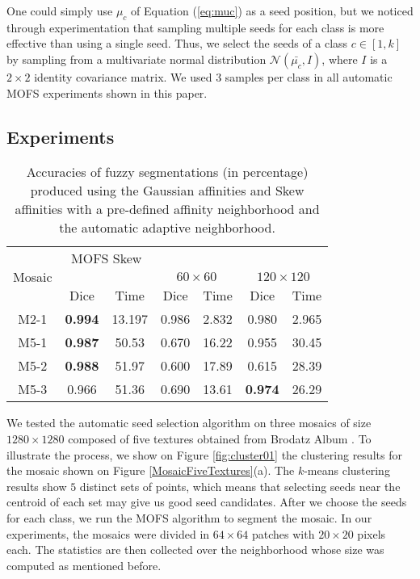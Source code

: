 \documentclass[10pt,twocolumn,letterpaper]{article}
\begin{document}
One could simply use $\mu_c$ of Equation (\ref{eq:muc}) as a seed position, but we noticed through experimentation that sampling multiple seeds for each class is more effective than using a single seed. Thus, we select the seeds of a class $c \in [1, k]$ by sampling from a multivariate normal distribution $\mathcal{N}(\bar{\mu_c}, I)$, where $I$ is a $2\times2$ identity covariance matrix. We used 3 samples per class in all automatic MOFS experiments shown in this paper. 

\subsection{Experiments}

\setlength{\tabcolsep}{6pt}
\begin{table*}
\begin{center}
\begin{tabular}{|c|c|c|c|c|c|c|}
\hline
\multirow{3}{*}{Mosaic}& \multicolumn{2}{|c|}{MOFS Skew}& \multicolumn{4}{|c|}{\cite{YUAN15a}}  \\
\cline{4-7}
  & \multicolumn{2}{|c|}{ } & \multicolumn{2}{|c|}{$60 \times 60$} & \multicolumn{2}{|c|}{$120 \times 120$}  \\
\cline{2-7}
  & Dice & Time & Dice & Time & Dice & Time  \\
\hline
M2-1 & \textbf{0.994} & 13.197 & 0.986 & 2.832 & 0.980 & 2.965 \\
\hline
M5-1 & \textbf{0.987} & 50.53 & 0.670 & 16.22 & 0.955 & 30.45   \\
\hline
M5-2 & \textbf{0.988} & 51.97 & 0.600 & 17.89 & 0.615 & 28.39   \\
\hline
M5-3 & 0.966 & 51.36 & 0.690 & 13.61 & \textbf{0.974} & 26.29   \\
\hline
\end{tabular}
\end{center}
\caption{Accuracies of fuzzy segmentations (in percentage) produced using the Gaussian affinities and Skew affinities with a pre-defined affinity neighborhood and the automatic adaptive neighborhood.}
\label{AccuracyTable}
\end{table*}


We tested the automatic seed selection algorithm on three mosaics of size $1280 \times 1280$ composed of five textures obtained from Brodatz Album \cite{BROD66a}. To illustrate the process, we show on Figure \ref{fig:cluster01} the clustering results for the mosaic shown on Figure \ref{MosaicFiveTextures}(a). The $k$-means clustering results show $5$ distinct sets of points, which means that selecting seeds near the centroid of each set may give us good seed candidates. After we choose the seeds for each class, we run the MOFS algorithm to segment the mosaic. In our experiments, the mosaics were divided in $64 \times 64$ patches with $20 \times 20$ pixels each. The statistics are then collected over the neighborhood whose size was computed as mentioned before.
\end{document}
